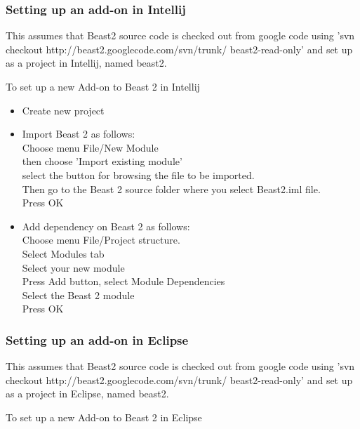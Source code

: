 \documentclass{article}
\begin{document}
\subsubsection{Setting up an add-on in Intellij}

This assumes that Beast2 source code is checked out from google code
using 'svn checkout http://beast2.googlecode.com/svn/trunk/ beast2-read-only' and set up 
as a project in Intellij, named beast2.

To set up a new Add-on to Beast 2 in Intellij

\begin{itemize}
\item Create new project
\item Import Beast 2 as follows:\\
Choose menu File/New Module\\
then choose 'Import existing module'\\
select the button for browsing the file to be imported.\\
Then go to the Beast 2 source folder where you select Beast2.iml
file.\\
Press OK
\item Add dependency on Beast 2 as follows:\\
Choose menu File/Project structure.\\
Select Modules tab\\
Select your new module\\
Press Add button, select Module Dependencies\\
Select the Beast 2 module\\
Press OK
\end{itemize}

\subsubsection{Setting up an add-on in Eclipse}

This assumes that Beast2 source code is checked out from google code
using 'svn checkout http://beast2.googlecode.com/svn/trunk/ beast2-read-only' and set up 
as a project in Eclipse, named beast2.

To set up a new Add-on to Beast 2 in Eclipse
\end{document}
